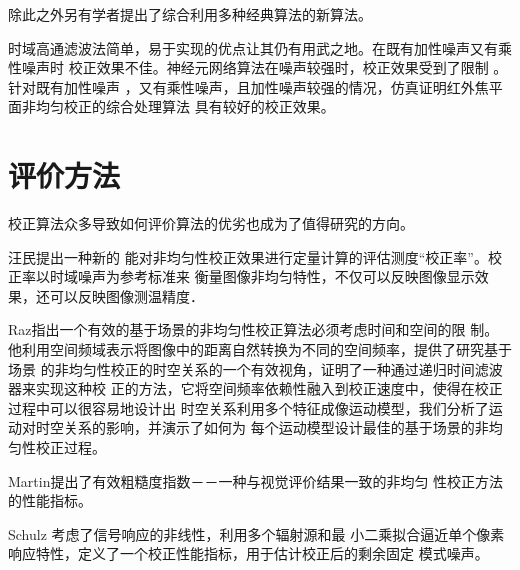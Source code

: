 \documentclass[../main]{subfiles}
\begin{document}
除此之外另有学者提出了综合利用多种经典算法的新算法。

时域高通滤波法简单，易于实现的优点让其仍有用武之地。在既有加性噪声又有乘性噪声时
校正效果不佳。神经元网络算法在噪声较强时，校正效果受到了限制 。针对既有加性噪声
，又有乘性噪声，且加性噪声较强的情况，仿真证明红外焦平面非均匀校正的综合处理算法
具有较好的校正效果。\cite{张小军2003红外焦平面非均匀校正的综合处理算法}

\section{评价方法}%
\label{sec:评价方法}

校正算法众多导致如何评价算法的优劣也成为了值得研究的方向。

汪民\cite{汪民2007基于校正率的红外焦平面阵列非均匀性校正评估新方法}提出一种新的
能对非均匀性校正效果进行定量计算的评估测度“校正率”。校正率以时域噪声为参考标准来
衡量图像非均匀特性，不仅可以反映图像显示效果，还可以反映图像测温精度．

Raz\cite{Raz2011A}指出一个有效的基于场景的非均匀性校正算法必须考虑时间和空间的限
制。他利用空间频域表示将图像中的距离自然转换为不同的空间频率，提供了研究基于场景
的非均匀性校正的时空关系的一个有效视角，证明了一种通过递归时间滤波器来实现这种校
正的方法，它将空间频率依赖性融入到校正速度中，使得在校正过程中可以很容易地设计出
时空关系利用多个特征成像运动模型，我们分析了运动对时空关系的影响，并演示了如何为
每个运动模型设计最佳的基于场景的非均匀性校正过程。

Martin\cite{Martin2007An}提出了有效粗糙度指数－－一种与视觉评价结果一致的非均匀
性校正方法的性能指标。

Schulz\cite{Schulz1995Nonuniformity} 考虑了信号响应的非线性，利用多个辐射源和最
小二乘拟合逼近单个像素响应特性，定义了一个校正性能指标，用于估计校正后的剩余固定
模式噪声。
\end{document}

